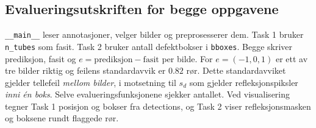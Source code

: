 \documentclass[11pt,a4paper]{article}
\newcommand{\code}[1]{\texttt{#1}}
\begin{document}
\subsection*{Evalueringsutskriften for begge oppgavene}
\code{\_\_main\_\_} leser annotasjoner, velger bilder og preprosesserer dem. Task 1 bruker \code{n\_tubes} som fasit. Task 2 bruker antall defektbokser i \code{bboxes}. Begge skriver prediksjon, fasit og $e=\text{prediksjon}-\text{fasit}$ per bilde. For $e=(-1,0,1)$ er ett av tre bilder riktig og feilens standardavvik er $0.82$ rør. Dette standardavviket gjelder tellefeil \emph{mellom bilder}, i motsetning til $s_d$ som gjelder refleksjonspiksler \emph{inni én boks}. Selve evalueringsfunksjonene sjekker antallet. Ved visualisering tegner Task 1 posisjon og bokser fra detections, og Task 2 viser refleksjonsmasken og boksene rundt flaggede rør.
\end{document}
